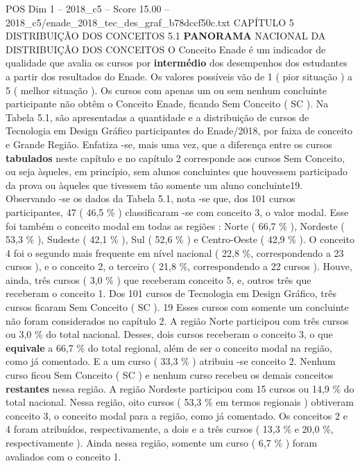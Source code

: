 \begin{textsample}{POS Dim 1 – 2018\_c5 – Score 15.00 – 2018\_c5/enade\_2018\_tec\_des\_graf\_b78dccf50c.txt}  \label{ex:f1_pos_065}
CAPÍTULO 5 DISTRIBUIÇÃO DOS CONCEITOS 5.1 \textbf{PANORAMA} NACIONAL DA DISTRIBUIÇÃO DOS CONCEITOS O Conceito Enade é um indicador de qualidade que avalia os cursos por \textbf{intermédio} dos desempenhos dos estudantes a partir dos resultados do Enade.
Os valores possíveis vão de 1 ( pior situação ) a 5 ( melhor situação ).
Os cursos com apenas um ou sem nenhum concluinte participante não obtêm o Conceito Enade, ficando Sem Conceito ( SC ).
Na Tabela 5.1, são apresentadas a quantidade e a distribuição de cursos de Tecnologia em Design Gráfico participantes do Enade/2018, por faixa de conceito e Grande Região.
Enfatiza -se, mais uma vez, que a diferença entre os cursos \textbf{tabulados} neste capítulo e no capítulo 2 corresponde aos cursos Sem Conceito, ou seja àqueles, em princípio, sem alunos concluintes que houvessem participado da prova ou àqueles que tivessem tão somente um aluno concluinte19.
Observando -se os dados da Tabela 5.1, nota -se que, dos 101 cursos participantes, 47 ( 46,5 \% ) classificaram -se com conceito 3, o valor modal.
Esse foi também o conceito modal em todas as regiões : Norte ( 66,7 \% ), Nordeste ( 53,3 \% ), Sudeste ( 42,1 \% ), Sul ( 52,6 \% ) e Centro-Oeste ( 42,9 \% ).
O conceito 4 foi o segundo mais frequente em nível nacional ( 22,8 \%, correspondendo a 23 cursos ), e o conceito 2, o terceiro ( 21,8 \%, correspondendo a 22 cursos ).
Houve, ainda, três cursos ( 3,0 \% ) que receberam conceito 5, e, outros três que receberam o conceito 1.
Dos 101 cursos de Tecnologia em Design Gráfico, três cursos ficaram Sem Conceito ( SC ). 19 Esses cursos com somente um concluinte não foram considerados no capítulo 2.
A região Norte participou com três cursos ou 3,0 \% do total nacional.
Desses, dois cursos receberam o conceito 3, o que \textbf{equivale} a 66,7 \% do total regional, além de ser o conceito modal na região, como já comentado.
E a um curso ( 33,3 \% ) atribuiu -se conceito 2.
Nenhum curso ficou Sem Conceito ( SC ) e nenhum curso recebeu os demais conceitos \textbf{restantes} nessa região.
A região Nordeste participou com 15 cursos ou 14,9 \% do total nacional.
Nessa região, oito cursos ( 53,3 \% em termos regionais ) obtiveram conceito 3, o conceito modal para a região, como já comentado.
Os conceitos 2 e 4 foram atribuídos, respectivamente, a dois e a três cursos ( 13,3 \% e 20,0 \%, respectivamente ).
Ainda nessa região, somente um curso ( 6,7 \% ) foram avaliados com o conceito 1.

\end{textsample}
